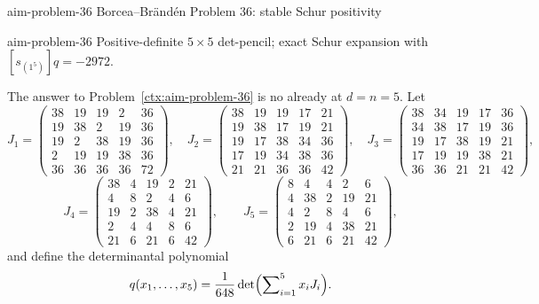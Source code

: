 \begin{cxsummary}{aim-problem-36}
Borcea--Br\"and\'en Problem 36: stable Schur positivity \citeyearpar{AIMStableProblems}
\end{cxsummary}

\begin{cxcertificate}{aim-problem-36}
Positive-definite $5\times5$ det-pencil; exact Schur expansion with $[s_{(1^5)}]q=-2972$.
\end{cxcertificate}

\begin{cxrefutation}
The answer to Problem~\ref{ctx:aim-problem-36} is no already at $d=n=5$.  Let
\begingroup
\scriptsize
\[
J_1=
\begin{pmatrix}
38&19&19&2&36\\
19&38&2&19&36\\
19&2&38&19&36\\
2&19&19&38&36\\
36&36&36&36&72
\end{pmatrix},\quad
J_2=
\begin{pmatrix}
38&19&19&17&21\\
19&38&17&19&21\\
19&17&38&34&36\\
17&19&34&38&36\\
21&21&36&36&42
\end{pmatrix},\quad
J_3=
\begin{pmatrix}
38&34&19&17&36\\
34&38&17&19&36\\
19&17&38&19&21\\
17&19&19&38&21\\
36&36&21&21&42
\end{pmatrix},
\]
\[
J_4=
\begin{pmatrix}
38&4&19&2&21\\
4&8&2&4&6\\
19&2&38&4&21\\
2&4&4&8&6\\
21&6&21&6&42
\end{pmatrix},\qquad
J_5=
\begin{pmatrix}
8&4&4&2&6\\
4&38&2&19&21\\
4&2&8&4&6\\
2&19&4&38&21\\
6&21&6&21&42
\end{pmatrix},
\]
\endgroup
and define the determinantal polynomial
\begin{equation}\label{eq:aim36-q}
q(x_1,\ldots,x_5)=\frac1{648}\det\Bigl(\sum\nolimits_{i=1}^5x_iJ_i\Bigr).
\end{equation}


\end{cxrefutation}

